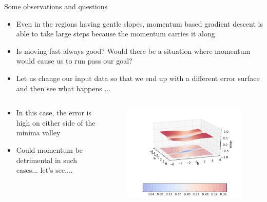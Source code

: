 \begin{frame}
	\begin{overlayarea}{\textwidth}{\textheight}
		\begin{block}{Some observations and questions}
			\begin{itemize}\justifying
				\item Even in the regions having gentle slopes, momentum based gradient descent is able to take large steps because the momentum carries it along
				      \item<2-> Is moving fast always good? Would there be a situation where momentum would cause us to run pass our goal?
				      \item<3-> Let us change our input data so that we end up with a different error surface and then see what happens ... 
			\end{itemize}
		\end{block}
	\end{overlayarea}
\end{frame}


\begin{frame}
	\begin{columns}
		\begin{overlayarea}{\textwidth}{\textheight}
			\begin{itemize}\justifying
				\item<2-> In this case, the error is high on either side of the minima valley
				\item<3-> Could momentum be detrimental in such cases... let's see....
			\end{itemize}
		\end{overlayarea}
		
		\begin{overlayarea}{\textwidth}{\textheight}
			\begin{figure}
				\includegraphics[scale=0.5]{images/module4/error_surface2.png}
			\end{figure}
		\end{overlayarea}
	\end{columns}
	
\end{frame}

